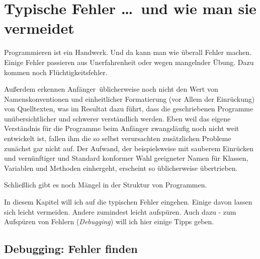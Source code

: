 \chapter{Typische Fehler \ldots\ und wie man sie vermeidet}
\renewcommand{\chaptertitle}{Typische Fehler \ldots\ und wie man sie vermeidet}

\lehead[]{\normalfont\sffamily\hspace*{-2.00cm}\textcolor{white}{\colorbox{lightblue}{\makebox[1.60cm][r]{\thechapter}}}\hspace{0.17cm}\textcolor{lightblue}{\chaptertitle}}
\rohead[]{\textcolor{lightblue}{\chaptertitle}\normalfont\sffamily\hspace*{0.17cm}\textcolor{white}{\colorbox{lightblue}{\makebox[1.60cm][l]{\thechapter}}}\hspace{-2.00cm}}
\rehead[]{\textcolor{lightblue}{AvHG, Inf, My}}
\lohead[]{\textcolor{lightblue}{AvHG, Inf, My}}

\lstset{style=myJava}

Programmieren ist ein Handwerk. Und da kann man wie überall Fehler machen.
Einige Fehler passieren aus Unerfahrenheit oder wegen mangelnder Übung. Dazu
kommen noch Flüchtigkeitsfehler.

Außerdem erkennen \glqq Anfänger\grqq\ üblicherweise noch nicht den Wert von
Namenskonventionen und einheitlicher Formatierung (vor Allem der Einrückung) von
Quelltexten, was im Resultat dazu führt, dass die geschriebenen Programme
unübersichtlicher und schwerer verständlich werden. Eben weil das eigene
Verständnis für die Programme beim Anfänger zwangsläufig noch nicht weit
entwickelt ist, fallen ihm die so selbst verursachten zusätzlichen Probleme
zunächst gar nicht auf. Der Aufwand, der beispielsweise mit sauberem Einrücken
und vernünftiger und Standard konformer Wahl geeigneter Namen für Klassen,
Variablen und Methoden einhergeht, erscheint so üblicherweise übertrieben.

Schließlich gibt es noch Mängel in der Struktur von Programmen.

In diesem Kapitel will ich auf die typischen Fehler eingehen. Einige davon
lassen sich leicht vermeiden. Andere zumindest leicht aufspüren. Auch dazu - zum
Aufspüren von Fehlern (\emph{Debugging}) will ich hier einige Tipps geben.


\section{Debugging: Fehler finden}


